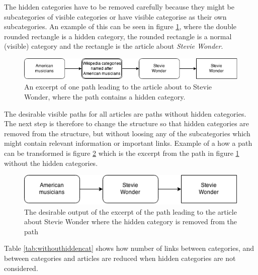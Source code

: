 The hidden categories have to be removed carefully because they might be subcategories of visible categories or have visible categorise as their own subcategories. An example of this can be seen in figure \ref{fig:stevie_wonder_hidden}, where the double rounded rectangle is a hidden category, the rounded rectangle is a normal (visible) category and the rectangle is the article about \emph{Stevie Wonder}.


\begin{figure}[h]
\centering
\includegraphics[width=\textwidth]{Chapters/Implementation/HiddenCategories/Stevie_wonder_hidden}
\caption[Example path with hidden category]{An excerpt of one path leading to the article about to Stevie Wonder, where the path contains a hidden category. }
\label{fig:stevie_wonder_hidden}
\end{figure}

The desirable visible paths for all articles are paths without hidden categories. The next step is therefore to change the structure so that hidden categories are removed from the structure, but without loosing any of the subcategories which might contain relevant information or  important links. Example of a how a path can be transformed is figure \ref{fig:stevie_wonder} which is the excerpt from the path in figure \ref{fig:stevie_wonder_hidden} without the hidden categories. 

\begin{figure}[h]
\centering
\includegraphics[width=.7\textwidth]{Chapters/Implementation/HiddenCategories/Stevie_wonder}
\caption[Example path without hidden category]{The desirable output of the excerpt of the path leading to the article about Stevie Wonder where the hidden category is removed from the path}
\label{fig:stevie_wonder}
\end{figure}


Table \ref{tab:withouthiddencat} shows how number of links between categories, and between categories and articles are reduced when hidden categories are not considered. 

